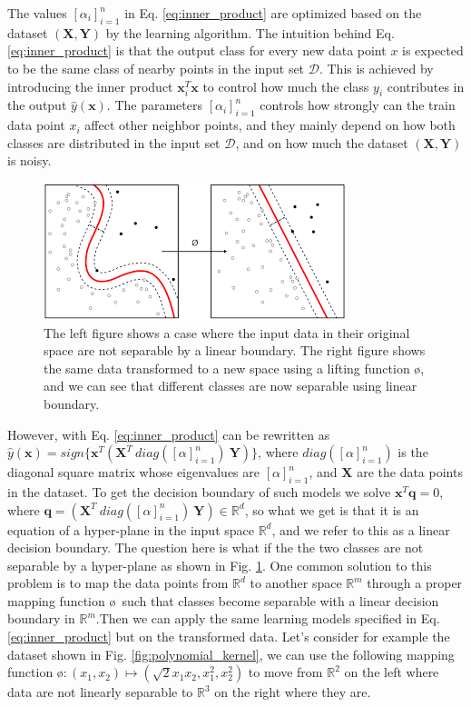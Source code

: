 The values $[\alpha_i]_{i=1}^n$ in Eq. \ref{eq:inner_product} are optimized based on the dataset $(\mathbf{X,Y})$ by the learning algorithm. The intuition behind Eq. \ref{eq:inner_product} is that the output class for every new data point $x$ is expected to be the same class of nearby points in the input set $\mathcal{D}$. This is achieved by introducing the inner product $\mathbf{x}_i^T\mathbf{x}$ to control how much the class $y_i$ contributes in the output $\hat{y}(\mathbf{x})$. The parameters $[\alpha_i]_{i=1}^n$ controls how strongly can the train data point $x_i$ affect other neighbor points, and they mainly depend on how both classes are distributed in the input set $\mathcal{D}$, and on how much the dataset $(\mathbf{X,Y})$ is noisy. 
\begin{figure}[H]
\centering
\includegraphics[scale=0.5]{LatexDiss/Dissertation/figs/svm.png}
\caption[The case where classes aren't separable using linear boundary]{The left figure shows a case where the input data in their original space are not separable by a linear boundary. The right figure shows the same data transformed to a new space using a lifting function \o, and we can see that different classes are now separable  using linear boundary.}
\label{fig:SVM_boundaries}
\end{figure}
However, with Eq. \ref{eq:inner_product} can be rewritten as $\hat{y}(\mathbf{x})=sign\{\textbf{x}^T(\mathbf{X}^T~diag([\alpha]_{i=1}^n)~\mathbf{Y})\}$, where $diag([\alpha]_{i=1}^n)$ is the diagonal square matrix whose eigenvalues are $[\alpha]_{i=1}^n$, and $\mathbf{X}$ are the data points in the dataset. To get the decision boundary of such models we solve $\textbf{x}^T\textbf{q}=0$, where $\textbf{q}=(\mathbf{X}^T~diag([\alpha]_{i=1}^n)~\mathbf{Y})\in\mathbb{R}^d$, so what we get is that it is an equation of a hyper-plane in the input space $\mathbb{R}^d$, and we refer to this as a linear decision boundary. The question here is what if the the two classes are not separable by a hyper-plane as shown in Fig. \ref{fig:SVM_boundaries}. One common solution to this problem is to map the data points from $\mathbb{R}^d$ to another space $\mathbb{R}^m$  through a proper mapping function \o~such that classes become separable with a linear decision boundary in $\mathbb{R}^m$.Then we can apply the same learning models specified in Eq. \ref{eq:inner_product} but on the transformed data. Let's consider for example the dataset shown in Fig. \ref{fig:polynomial_kernel},  we can use the following mapping function \o$:(x_1,x_2)\mapsto (\sqrt{2}x_1x_2,x_1^2,x_2^2)$ to move from $\mathbb{R}^2$ on the left where data are not linearly separable to $\mathbb{R}^3$ on the right where they are.
